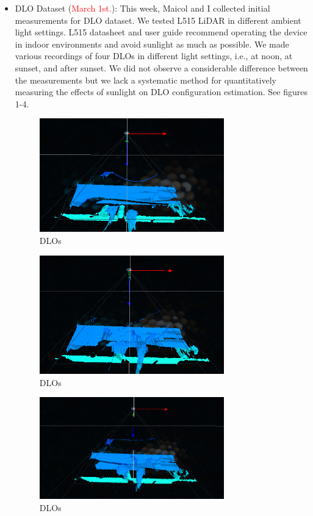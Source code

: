 \documentclass[11pt]{article}
\begin{document}
\begin{itemize}
  \item DLO Dataset (\textcolor{red}{March 1st.}): This week, Maicol and I
  collected initial measurements for DLO dataset. We tested L515 LiDAR in different
  ambient light settings. L515 datasheet and user guide recommend operating the
  device in indoor environments and avoid sunlight as much as possible. We
  made various recordings of four DLOs in different light settings, i.e., at noon,
  at sunset, and after sunset. We did not observe a considerable difference between
  the measurements but we lack a systematic method for quantitatively measuring the
  effects of sunlight on DLO configuration estimation. See figures 1-4.\

  \begin{figure}[h]
    \caption{DLOs}
    \includegraphics[width=8cm]{side_01.png}
    \centering
  \end{figure}


  \begin{figure}[h]
    \caption{DLOs}
    \includegraphics[width=8cm]{side_02.png}
    \centering
  \end{figure}

  \begin{figure}[h]
    \caption{DLOs}
    \includegraphics[width=8cm]{side_03.png}
    \centering
  \end{figure}


\end{itemize}
\end{document}
